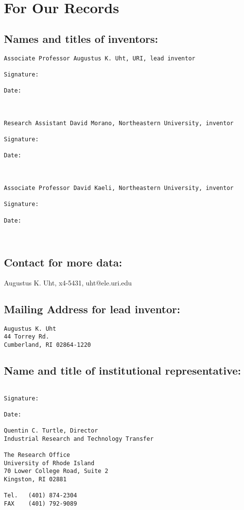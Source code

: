 \documentclass[10pt,dvips]{article}
\begin{document}
\newpage

\section{For Our Records}

\subsection{Names and titles of inventors:}

\begin{verbatim}
Associate Professor Augustus K. Uht, URI, lead inventor

Signature:

Date:



Research Assistant David Morano, Northeastern University, inventor

Signature:

Date:



Associate Professor David Kaeli, Northeastern University, inventor

Signature:

Date:



\end{verbatim}

\subsection{Contact for more data:} Augustus K. Uht, x4-5431, uht@ele.uri.edu

\subsection{Mailing Address for lead inventor:}

\begin{verbatim}
Augustus K. Uht
44 Torrey Rd.
Cumberland, RI 02864-1220
\end{verbatim}

\subsection{Name and title of institutional representative:}

\begin{verbatim}

Signature:

Date:

Quentin C. Turtle, Director
Industrial Research and Technology Transfer

The Research Office
University of Rhode Island
70 Lower College Road, Suite 2
Kingston, RI 02881

Tel.   (401) 874-2304
FAX    (401) 792-9089
\end{verbatim}
\end{document}
